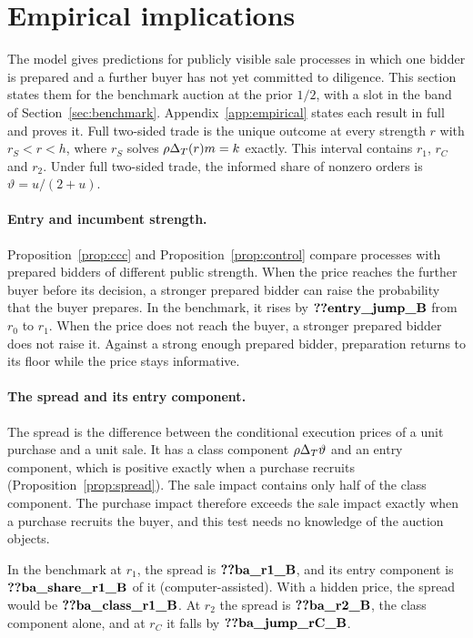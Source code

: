\section{Empirical implications}\label{sec:empirical}

The model gives predictions for publicly visible sale processes in which one bidder is prepared and a further buyer
has not yet committed to diligence. This section states them for the benchmark auction at the prior \(1/2\), with a
slot in the band of Section~\ref{sec:benchmark}. Appendix~\ref{app:empirical} states each result in full and proves
it. Full two-sided trade is the unique outcome at every strength \(r\) with \(r_S<r<h\), where \(r_S\) solves
\(\rho\Delta_T(r)m=k\) exactly. This interval contains \(r_1\), \(r_C\) and \(r_2\). Under full two-sided trade, the
informed share of nonzero orders is \(\vartheta=u/(2+u)\).

\paragraph{Entry and incumbent strength.} Proposition~\ref{prop:ccc} and Proposition~\ref{prop:control} compare
processes with prepared bidders of different public strength. When the price reaches the further buyer before its
decision, a stronger prepared bidder can raise the probability that the buyer prepares. In the benchmark, it rises by
\(\reg{entry_jump_B}\) from \(r_0\) to \(r_1\). When the price does not reach the buyer, a stronger prepared bidder
does not raise it. Against a strong enough prepared bidder, preparation returns to its floor while the price stays
informative.

\paragraph{The spread and its entry component.} The spread is the difference between the conditional execution
prices of a unit purchase and a unit sale. It has a class component \(\rho\Delta_T\vartheta\) and an entry component, which
is positive exactly when a purchase recruits (Proposition~\ref{prop:spread}). The sale impact contains only half of the
class component. The purchase impact therefore exceeds the sale impact exactly when a purchase recruits the buyer, and
this test needs no knowledge of the auction objects.

In the benchmark at \(r_1\), the spread is \(\reg{ba_r1_B}\), and
its entry component is \(\reg{ba_share_r1_B}\) of it (computer-assisted). With a hidden price, the spread would be
\(\reg{ba_class_r1_B}\). At \(r_2\) the spread is \(\reg{ba_r2_B}\), the class component alone, and at \(r_C\) it falls
by \(\reg{ba_jump_rC_B}\).

